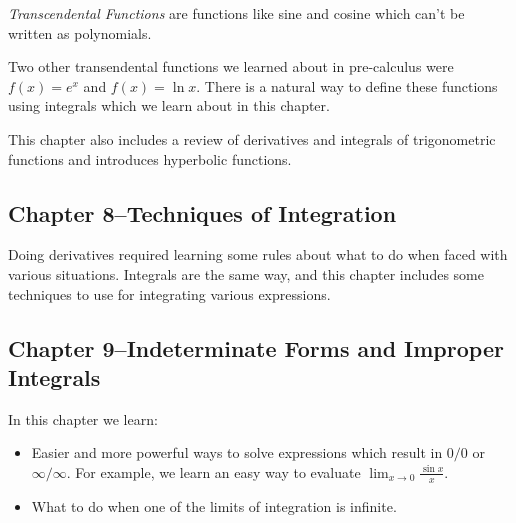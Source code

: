 \documentclass[fleqn, onecolumn]{article}
\begin{document}
{\em Transcendental Functions} are functions like sine and cosine which can't be written as polynomials.

Two other transendental functions we learned about in pre-calculus were $f(x) = e^x$ and $f(x) = \ln x$.  There is a
natural way to define these functions using integrals which we learn about in this chapter.  

This chapter also includes a review of derivatives and integrals of trigonometric functions and introduces hyperbolic functions.

\subsection{Chapter 8--Techniques of Integration}

Doing derivatives required learning some rules about what to do when faced with various situations.  Integrals are the
same way, and this chapter includes some techniques to use for integrating various expressions.

\subsection{Chapter 9--Indeterminate Forms and Improper Integrals}

In this chapter we learn:
\begin{itemize}
\item Easier and more powerful ways to solve expressions which result in $0/0$ or $\infty/\infty$.  For example, we
  learn an easy way to evaluate $\lim_{x \to 0} \frac{\sin x}{x}$.

\item What to do when one of the limits of integration is infinite.
\end{itemize}


\end{document}
